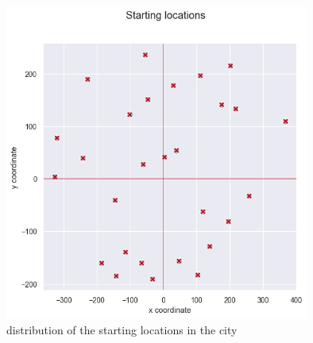 \begin{figure}[h]
	\centering
	\includegraphics[width=100mm]{figures/starting_locations.png}
	\caption[Distribution of starting locations]{distribution of the starting locations in the city}
	\label{fig:starting_locs}
\end{figure}



